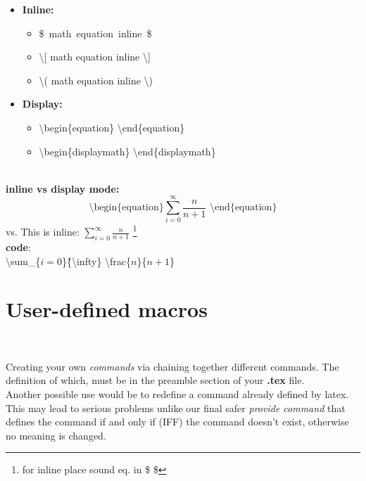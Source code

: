 \begin{itemize}[label={}]
    \item \textbf{Inline:}
    \begin{itemize}[label={\bullet}]
         \item  \mbox{\$ math equation inline \$}
         \item  \textbackslash{[ math equation inline }\textbackslash{]}
         \item  \textbackslash{( math equation inline }\textbackslash{)}
    \end{itemize}
    \item \textbf{Display:}
    \begin{itemize}[label={\bullet}]
         \item \textbackslash{begin}\{equation\} \textbackslash{end}\{equation\}
         \item \textbackslash{begin}\{displaymath\} \textbackslash{end}\{displaymath\}
    \end{itemize}
\end{itemize}\\
\textbf{inline vs display mode:}\\
\begin{equation}
    \mbox{\textbackslash{begin}\{equation\}}
    \sum_{i=0}^{\infty} \frac{n}{n+1}
    \mbox{  \textbackslash{end}\{equation\}}    
\end{equation}
vs.
This is inline: $\sum_{i=0}^{\infty} \frac{n}{n+1}$ \footnote{for inline place sound eq. in \$ \$} \\ 

\textbf{code}: \\
\textbackslash{sum}\_\{$i=0$\}\^\{\textbackslash{infty}\} \textbackslash{frac}\{$n$\}\{$n+1$\} \\





\section{User-defined macros} ~\cite{uhedu_macros}

Creating your own \textit{commands} via chaining together different
commands. The definition of which, must be in the preamble section 
of your \textbf{.tex} file. \\
Another possible use would be to redefine a command already
defined by latex. This may lead to serious problems unlike our final
safer \textit{provide command} that defines the command 
if and only if (IFF) the command doesn't exist, otherwise no 
meaning is changed. 



